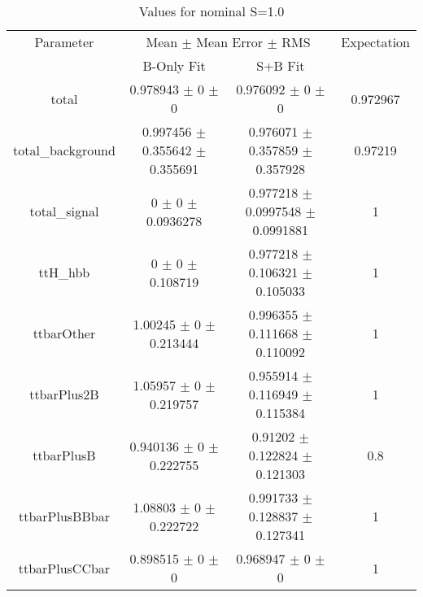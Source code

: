 \begin{table}
\centering
\caption{Values for nominal S=1.0}
\begin{tabular}{cccc}
\toprule
Parameter & \multicolumn{2}{c}{Mean $\pm$ Mean Error $\pm$ RMS} & Expectation\\
 & B-Only Fit & S+B Fit & \\
\midrule
total & \num{0.978943} $\pm$ \num{0} $\pm$ \num{0} & \num{0.976092} $\pm$ \num{0} $\pm$ \num{0} & \num{0.972967}\\
total\_background & \num{0.997456} $\pm$ \num{0.355642} $\pm$ \num{0.355691} & \num{0.976071} $\pm$ \num{0.357859} $\pm$ \num{0.357928} & \num{0.97219}\\
total\_signal & \num{0} $\pm$ \num{0} $\pm$ \num{0.0936278} & \num{0.977218} $\pm$ \num{0.0997548} $\pm$ \num{0.0991881} & \num{1}\\
ttH\_hbb & \num{0} $\pm$ \num{0} $\pm$ \num{0.108719} & \num{0.977218} $\pm$ \num{0.106321} $\pm$ \num{0.105033} & \num{1}\\
ttbarOther & \num{1.00245} $\pm$ \num{0} $\pm$ \num{0.213444} & \num{0.996355} $\pm$ \num{0.111668} $\pm$ \num{0.110092} & \num{1}\\
ttbarPlus2B & \num{1.05957} $\pm$ \num{0} $\pm$ \num{0.219757} & \num{0.955914} $\pm$ \num{0.116949} $\pm$ \num{0.115384} & \num{1}\\
ttbarPlusB & \num{0.940136} $\pm$ \num{0} $\pm$ \num{0.222755} & \num{0.91202} $\pm$ \num{0.122824} $\pm$ \num{0.121303} & \num{0.8}\\
ttbarPlusBBbar & \num{1.08803} $\pm$ \num{0} $\pm$ \num{0.222722} & \num{0.991733} $\pm$ \num{0.128837} $\pm$ \num{0.127341} & \num{1}\\
ttbarPlusCCbar & \num{0.898515} $\pm$ \num{0} $\pm$ \num{0} & \num{0.968947} $\pm$ \num{0} $\pm$ \num{0} & \num{1}\\
\bottomrule
\end{tabular}
\end{table}